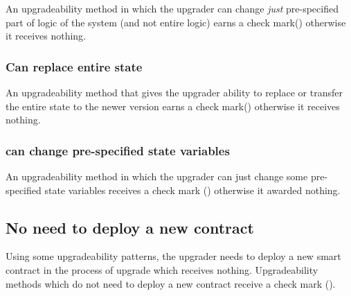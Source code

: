 An upgradeability method in which the upgrader can change \emph{just} pre-specified part of logic of the system (and not entire logic) earns a check mark(\checkmark) otherwise it receives nothing.

\subsubsection{Can replace entire state}

An upgradeability method that gives the upgrader ability to replace or transfer the entire state to the newer version earns a check mark(\checkmark) otherwise it receives nothing.

\subsubsection{can change pre-specified state variables}
 
An upgradeability method in which the upgrader can just change some pre-specified state variables receives a check mark (\checkmark) otherwise it awarded nothing.
 

 





\subsection{No need to deploy a new contract}

Using some upgradeability patterns, the upgrader needs to deploy a new smart contract in the process of upgrade which receives nothing. Upgradeability methods which do not need to deploy a new contract receive a check mark (\checkmark).

